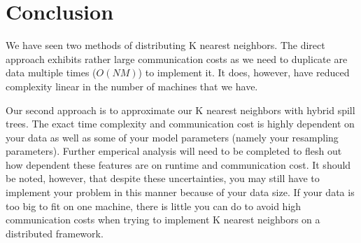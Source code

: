 \section{Conclusion}

\vspace{5 mm}
\noindent
We have seen two methods of distributing K nearest neighbors. The direct 
approach exhibits rather large communication costs as we need to duplicate are 
data multiple times ($O(N M)$) to implement it. It does, however, have 
reduced complexity linear in the number of machines that we have. 

\vspace{5 mm}
\noindent
Our second approach is to approximate our K nearest neighbors with hybrid spill 
trees. The exact time complexity and communication cost is highly dependent on 
your data as well as some of your model parameters (namely your resampling 
parameters). Further emperical analysis will need to be completed to flesh out 
how dependent these features are on runtime and communication cost. It should 
be noted, however, that despite these uncertainties, you may still have to 
implement your problem in this manner because of your data size. If your data 
is too big to fit on one machine, there is little you can do to avoid high 
communication costs when trying to implement K nearest neighbors on a 
distributed framework.